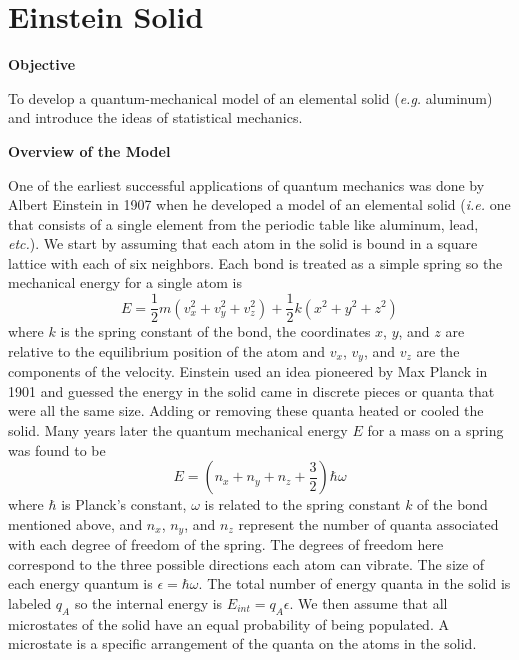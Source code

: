 \section{Einstein Solid}

\makelabheader %

\textbf{Objective}

To develop a quantum-mechanical model of an elemental solid ({\it e.g.} aluminum) and
introduce the ideas of statistical mechanics.

\textbf{Overview of the Model}

One of the earliest successful applications of quantum mechanics was done by Albert Einstein
in 1907 when he developed a model of an elemental solid ({\it i.e.} one that consists of a single
element from the periodic table like aluminum, lead, {\it etc.}).
We start by assuming that each atom in the solid is bound in a square lattice with each
of six neighbors. Each bond is treated as a simple spring so the 
mechanical energy for a single atom is
%
%
%
\begin{equation}
E = \frac{1}{2} m (v_x^2 + v_y^2 + v_z^2) + \frac{1}{2} k (x^2 + y^2 + z^2)
\end{equation}
where $k$ is the spring constant of the bond, the coordinates $x$, $y$, and $z$ are relative to the
equilibrium position of the atom and $v_x$, $v_y$, and $v_z$ are the components of the velocity.
Einstein used an idea pioneered by Max Planck in 1901 and
guessed the energy in the solid came in discrete pieces or quanta that were all
the same size.
Adding or removing these quanta heated or cooled the solid.
Many years later the quantum mechanical energy $E$ for a mass on a spring was found 
to be
\begin{equation}
E = (n_x + n_y + n_z + \frac{3}{2})\hbar \omega
\end{equation}
where $\hbar$ is Planck's constant, $\omega$ is related to the spring constant $k$ of the bond
mentioned
above, and $n_x$, $n_y$, and $n_z$ represent the number of quanta associated with each
degree of freedom of the spring.
The degrees of freedom here correspond to the three possible directions each atom can vibrate.
The size of each energy quantum is $\epsilon = \hbar \omega$.
The total number of energy quanta in the solid is labeled $q_A$ so the internal energy is
$E_{int} = q_A\epsilon$.
We then assume that all microstates of the solid have an equal probability of being populated.
A microstate is a specific arrangement of the quanta on the atoms in the solid.

